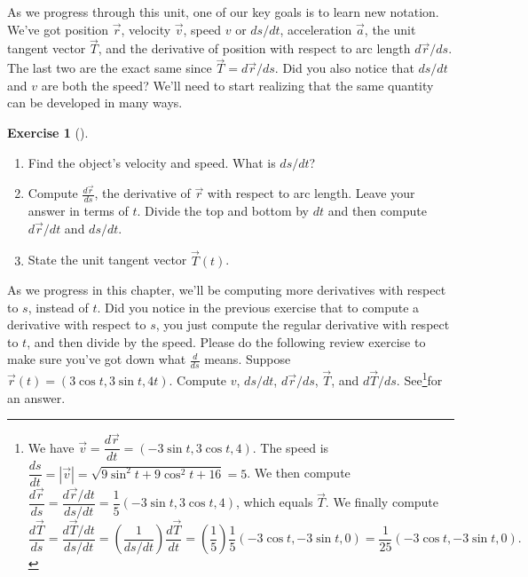 \documentclass[10pt,]{book}
\theoremstyle{plain}
\theoremstyle{definition}
\theoremstyle{definition}
\theoremstyle{definition}
\theoremstyle{definition}
\newtheorem{exploration}[project]{Exercise}
\theoremstyle{definition}
\numberwithin{equation}{section}
\begin{document}
As we progress through this unit, one of our key goals is to learn new notation. We've got position \(\vec r\), velocity \(\vec v\), speed \(v\) or \(ds/dt\), acceleration \(\vec a\), the unit tangent vector \(\vec T\), and the derivative of position with respect to arc length \(d\vec r/ds\). The last two are the exact same since \(\vec T = d\vec r/ds\). Did you also notice that \(ds/dt\) and \(v\) are both the speed? We'll need to start realizing that the same quantity can be developed in many ways.%
\begin{exploration}[]\label{exploration-169}
\leavevmode%
\begin{enumerate}[font=\bfseries,label=(\alph*),ref=\alph*]
\item\label{task-398} Find the object's velocity and speed. What is \(ds/dt\)?%
\item\label{task-399} Compute \(\frac{d\vec r}{ds}\), the derivative of \(\vec r\) with respect to arc length. Leave your answer in terms of \(t\). Divide the top and bottom by \(dt\) and then compute \(d\vec r/dt\) and \(ds/dt\).%
%
\item\label{task-400} State the unit tangent vector \(\vec T(t)\).%
\end{enumerate}
\end{exploration}
As we progress in this chapter, we'll be computing more derivatives with respect to \(s\), instead of \(t\). Did you notice in the previous exercise that to compute a derivative with respect to \(s\), you just compute the regular derivative with respect to \(t\), and then divide by the speed. Please do the following review exercise to make sure you've got down what \(\frac{d}{ds}\) means.%
Suppose \(\vec r(t)=(3\cos t,3\sin t,4t)\). Compute \(v\), \(ds/dt\), \(d\vec r/ds\), \(\vec T\), and \(d\vec T/ds\). See\footnote{We have \(\vec v = \dfrac{d\vec r}{dt} = (-3\sin t, 3\cos t, 4)\). The speed is \(\dfrac{ds}{dt}=|\vec v| = \sqrt{9\sin^2t+9\cos^2t+16}=5\). We then compute \(\dfrac{d\vec r}{ds}=\dfrac{d\vec r/dt}{ds/dt} = \dfrac{1}{5}(-3\sin t, 3\cos t, 4)\), which equals \(\vec T\). We finally compute%
\begin{equation*}
\dfrac{d\vec T}{ds}=\dfrac{d\vec T/dt}{ds/dt}=\left(\dfrac{1}{ds/dt}\right)\dfrac{d\vec T}{dt} = \left(\dfrac{1}{5}\right)\dfrac{1}{5}(-3\cos t, -3\sin t, 0) =  \dfrac{1}{25}(-3\cos t, -3\sin t, 0).
\end{equation*}
\label{fn-10}}for an answer.%
\typeout{************************************************}
\typeout{************************************************}
\end{document}
